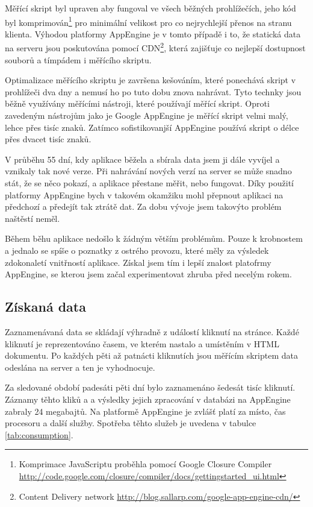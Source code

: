 \documentclass[bc,male,java,dept456]{diploma}						%
\begin{document}
Měřící skript byl upraven aby fungoval ve všech běžných prohlížečích, jeho kód byl komprimován\footnote{Komprimace JavaScriptu proběhla pomocí Google Closure Compiler \url{http://code.google.com/closure/compiler/docs/gettingstarted_ui.html}} pro minimální velikost pro co nejrychlejší přenos na stranu klienta. Výhodou platformy AppEngine je v tomto případě i to, že statická data na serveru jsou poskutována pomocí CDN\footnote{Content Delivery network \url{http://blog.sallarp.com/google-app-engine-cdn/}}, která zajišťuje co nejlepší dostupnost souborů a tímpádem i měřícího skriptu.

Optimalizace měřícího skriptu je završena kešováním, které ponechává skript v pro\-hlí\-že\-či dva dny a nemusí ho po tuto dobu znova nahrávat. Tyto technky jsou běžně využívány měřícími nástroji, které používají měřící skript. Oproti zavedeným nástrojům jako je Google AppEngine je měřící skript velmi malý, lehce přes tisíc znaků. Zatímco sofistikovanjší AppEngine používá skript o délce přes dvacet tisíc znaků.

V průběhu 55 dní, kdy aplikace běžela a sbírala data jsem ji dále vyvíjel a vznikaly tak nové verze. Při nahrávání nových verzí na server se může snadno stát, že se něco pokazí, a aplikace přestane měřit, nebo fungovat. Díky použití platformy AppEngine bych v  takovém okamžiku mohl přepnout aplikaci na předchozí a předejít tak ztrátě dat. Za dobu vývoje jsem takovýto problém naštěstí neměl.

Během běhu aplikace nedošlo k žádným větším problémům. Pouze k krobnostem a jednalo se spíše o poznatky z ostrého provozu, které měly za výsledek zdokonaletí vnitřností aplikace. Získal jsem tím i lepší znalost platofrmy AppEngine, se kterou jsem začal experimentovat zhruba před necelým rokem.


\subsection{Získaná data}

Zaznamenávaná data se skládají výhradně z událostí kliknutí na stránce. Každé kliknutí je reprezentováno časem, ve kterém nastalo a umístěním v HTML dokumentu. Po každých pěti až patnácti kliknutích jsou měřícím skriptem data odeslána na server a ten je vyhodnocuje.

Za sledované období padesáti pěti dní bylo zaznamenáno šedesát tisíc kliknutí. Zá\-zna\-my těhto kliků a a výsledky jejich zpracování v databázi na AppEngine zabraly 24 megabajtů. Na platformě AppEngine je zvlášť platí za místo, čas procesoru a další služby. Spotřeba těhto služeb je uvedena v tabulce \ref{tab:consumption}.
\end{document}
